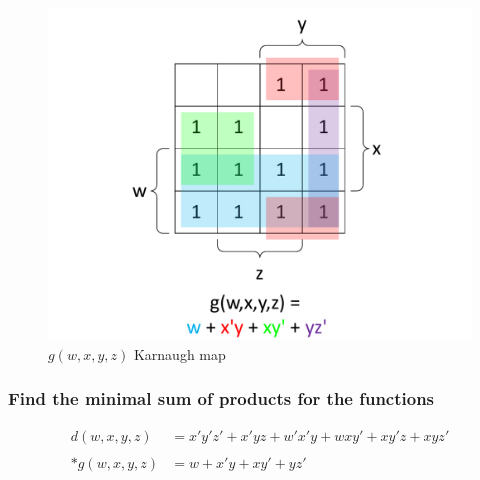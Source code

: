\documentclass[12pt,a4paper]{article}
\begin{document}
\begin{figure}[h]
\centering
\caption{$g(w,x,y,z)$ Karnaugh map}
\includegraphics[scale=0.56]{./../img/q5-2_g.pdf}
\end{figure}

\subsubsection{Find the minimal sum of products for the functions}
\begin{align*}
d(w,x,y,z) &= x'y'z' + x'yz + w'x'y + wxy' + xy'z + xyz' \\
\\*
g(w,x,y,z) &= w + x'y + xy' + yz'
\end{align*}
\end{document}
